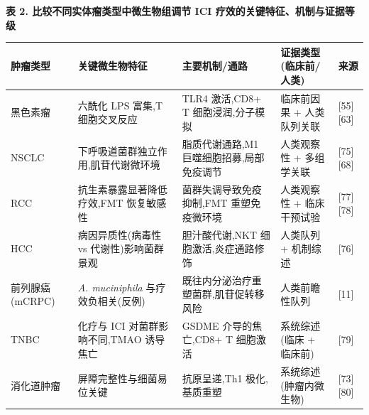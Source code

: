 \textbf{表 2. 比较不同实体瘤类型中微生物组调节 ICI 疗效的关键特征、机制与证据等级}

{\def\LTcaptype{none} %
\begin{longtable}[]{@{}
  >{\raggedright\arraybackslash}p{}
  >{\raggedright\arraybackslash}p{}
  >{\raggedright\arraybackslash}p{}
  >{\raggedright\arraybackslash}p{}
  >{\raggedright\arraybackslash}p{}@{}}
\toprule\noalign{}
\begin{minipage}[b]{\linewidth}\raggedright
肿瘤类型
\end{minipage} & \begin{minipage}[b]{\linewidth}\raggedright
关键微生物特征
\end{minipage} & \begin{minipage}[b]{\linewidth}\raggedright
主要机制/通路
\end{minipage} & \begin{minipage}[b]{\linewidth}\raggedright
证据类型 (临床前/人类)
\end{minipage} & \begin{minipage}[b]{\linewidth}\raggedright
来源
\end{minipage} \\
\midrule\noalign{}
\endhead
\bottomrule\noalign{}
\endlastfoot
黑色素瘤 & 六酰化 LPS 富集,T 细胞交叉反应 & TLR4 激活,CD8+ T 细胞浸润,分子模拟 & 临床前因果 + 人类队列关联 & {[}55{]}{[}63{]} \\
NSCLC & 下呼吸道菌群独立作用,肌苷代谢微环境 & 脂质代谢通路,M1 巨噬细胞招募,局部免疫调节 & 人类观察性 + 多组学关联 & {[}75{]}{[}68{]} \\
RCC & 抗生素暴露显著降低疗效,FMT 恢复敏感性 & 菌群失调导致免疫抑制,FMT 重塑免疫微环境 & 人类观察性 + 临床干预试验 & {[}77{]}{[}78{]} \\
HCC & 病因异质性(病毒性 vs 代谢性)影响菌群景观 & 胆汁酸代谢,NKT 细胞激活,炎症通路修饰 & 人类队列 + 机制综述 & {[}76{]} \\
前列腺癌 (mCRPC) & \emph{A. muciniphila} 与疗效负相关(反例) & 既往内分泌治疗重塑菌群,肌苷促转移风险 & 人类前瞻性队列 & {[}11{]} \\
TNBC & 化疗与 ICI 对菌群影响不同,TMAO 诱导焦亡 & GSDME 介导的焦亡,CD8+ T 细胞激活 & 系统综述 (临床 + 临床前) & {[}79{]} \\
消化道肿瘤 & 屏障完整性与细菌易位关键 & 抗原呈递,Th1 极化,基质重塑 & 系统综述 (肿瘤内微生物) & {[}73{]}{[}80{]} \\
\end{longtable}
}


